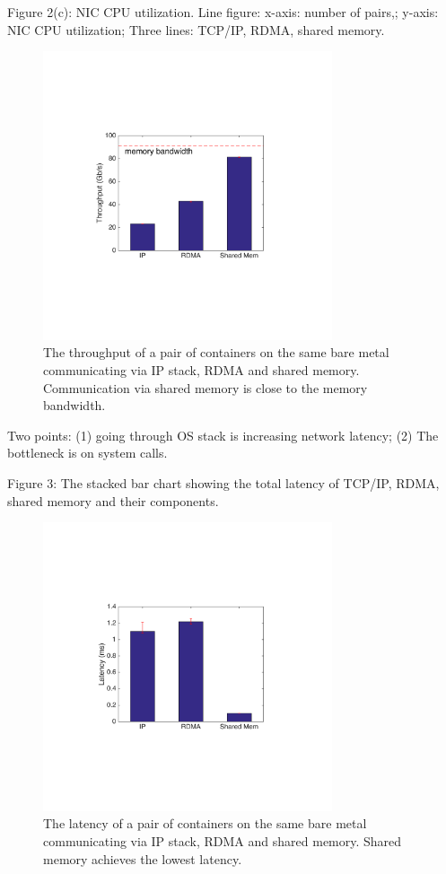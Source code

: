 Figure 2(c): NIC CPU utilization. Line figure: x-axis: number of pairs,; y-axis: NIC CPU utilization; Three lines: TCP/IP, RDMA, shared memory.

\begin{figure}[!ht]
     \centering 
     \includegraphics[width=3.35in]{figures/motivation/eval_baremetal_thr.pdf} 
     \caption{\label{fig:eval_baremetal_thr} The throughput of a pair of containers on the same bare metal communicating via IP stack, RDMA and shared memory. Communication via shared memory is close to the memory bandwidth.} 
\end{figure} 

Two points: (1) going through OS stack is increasing network latency; (2) The bottleneck is on system calls.

Figure 3: The stacked bar chart showing the total latency of TCP/IP, RDMA, shared memory and their components.

\begin{figure}[!ht]
     \centering 
     \includegraphics[width=3.35in]{figures/motivation/eval_baremetal_latency.pdf} 
     \caption{\label{fig:eval_baremetal_latency} The latency of a pair of containers on the same bare metal communicating via IP stack, RDMA and shared memory. Shared memory achieves the lowest latency.} 
\end{figure} 

